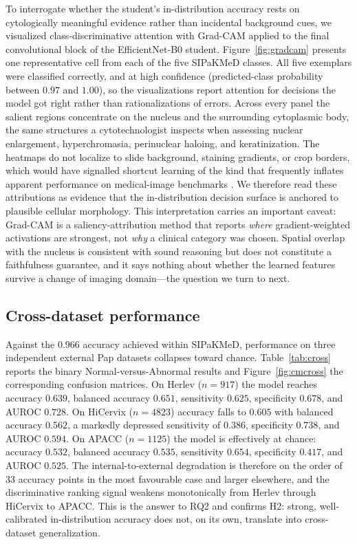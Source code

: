 \documentclass[twocolumn]{article}
\begin{document}
To interrogate whether the student's in-distribution accuracy rests on cytologically meaningful evidence rather than incidental background cues, we visualized class-discriminative attention with Grad-CAM \citep{selvaraju2017gradcam} applied to the final convolutional block of the EfficientNet-B0 student. Figure~\ref{fig:gradcam} presents one representative cell from each of the five SIPaKMeD classes. All five exemplars were classified correctly, and at high confidence (predicted-class probability between $0.97$ and $1.00$), so the visualizations report attention for decisions the model got right rather than rationalizations of errors. Across every panel the salient regions concentrate on the nucleus and the surrounding cytoplasmic body, the same structures a cytotechnologist inspects when assessing nuclear enlargement, hyperchromasia, perinuclear haloing, and keratinization. The heatmaps do not localize to slide background, staining gradients, or crop borders, which would have signalled shortcut learning of the kind that frequently inflates apparent performance on medical-image benchmarks \citep{geirhos2020shortcut}. We therefore read these attributions as evidence that the in-distribution decision surface is anchored to plausible cellular morphology. This interpretation carries an important caveat: Grad-CAM is a saliency-attribution method that reports \emph{where} gradient-weighted activations are strongest, not \emph{why} a clinical category was chosen. Spatial overlap with the nucleus is consistent with sound reasoning but does not constitute a faithfulness guarantee, and it says nothing about whether the learned features survive a change of imaging domain---the question we turn to next.

\subsection{Cross-dataset performance}

Against the $0.966$ accuracy achieved within SIPaKMeD, performance on three independent external Pap datasets collapses toward chance. Table~\ref{tab:cross} reports the binary Normal-versus-Abnormal results and Figure~\ref{fig:cmcross} the corresponding confusion matrices. On Herlev \citep{jantzen2005herlev} ($n=917$) the model reaches accuracy $0.639$, balanced accuracy $0.651$, sensitivity $0.625$, specificity $0.678$, and AUROC $0.728$. On HiCervix \citep{cai2024hicervix} ($n=4823$) accuracy falls to $0.605$ with balanced accuracy $0.562$, a markedly depressed sensitivity of $0.386$, specificity $0.738$, and AUROC $0.594$. On APACC ($n=1125$) the model is effectively at chance: accuracy $0.532$, balanced accuracy $0.535$, sensitivity $0.654$, specificity $0.417$, and AUROC $0.525$. The internal-to-external degradation is therefore on the order of $33$ accuracy points in the most favourable case and larger elsewhere, and the discriminative ranking signal weakens monotonically from Herlev through HiCervix to APACC. This is the answer to RQ2 and confirms H2: strong, well-calibrated in-distribution accuracy does not, on its own, translate into cross-dataset generalization.
\end{document}
